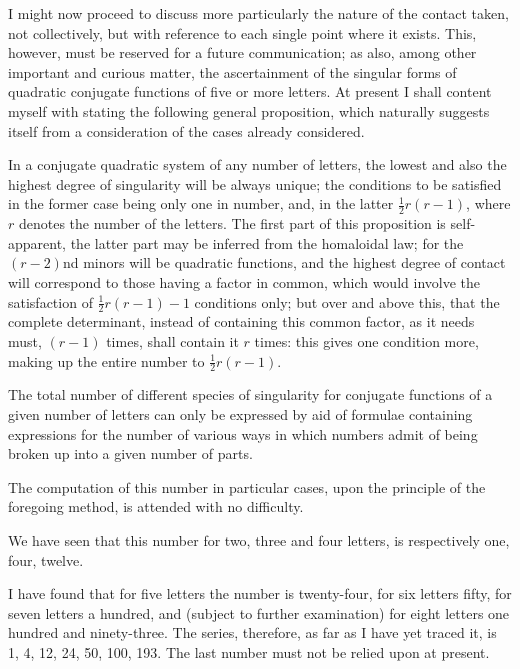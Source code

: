 \documentclass[11pt]{article}
\newcommand{\sourcepage}[1]{\marginpar{\scriptsize p.~#1}}
\begin{document}
{{I might now proceed to discuss more particularly the nature of the contact taken, not collectively, but with reference to each single point where it exists. This, however, must be reserved for a future communication; as also, among other important and curious matter, the ascertainment of the singular forms of quadratic conjugate functions of five or more letters. At present I shall content myself with stating the following general proposition, which naturally suggests itself from a consideration of the cases already considered.

In a conjugate quadratic system of any number of letters, the lowest and also the highest degree of singularity will be always unique; the conditions to be satisfied in the former case being only one in number, and, in the latter $\frac12 r(r-1)$, where $r$ denotes the number of the letters. The first part of this proposition is self-apparent, the latter part may be inferred from the homaloidal law; for the $(r-2)$nd minors will be quadratic functions, and the highest degree of contact will correspond to those having a factor in common, which would involve the satisfaction of $\frac12 r(r-1)-1$ conditions only; but over and above this, that the complete determinant, instead of containing this common factor, as it needs must, $(r-1)$ times, shall contain it $r$ times: this gives one condition more, making up the entire number to $\frac12 r(r-1)$.

The total number of different species of singularity for conjugate functions of a given number of letters can only be expressed by aid of formulae containing expressions for the number of various ways in which numbers admit of being broken up into a given number of parts.

The computation of this number in particular cases, upon the principle of the foregoing method, is attended with no difficulty.

\sourcepage{239}
We have seen that this number for two, three and four letters, is respectively one, four, twelve.

I have found that for five letters the number is twenty-four, for six letters fifty, for seven letters a hundred, and (subject to further examination) for eight letters one hundred and ninety-three. The series, therefore, as far as I have yet traced it, is 1, 4, 12, 24, 50, 100, 193. The last number must not be relied upon at present.

}}
\end{document}
